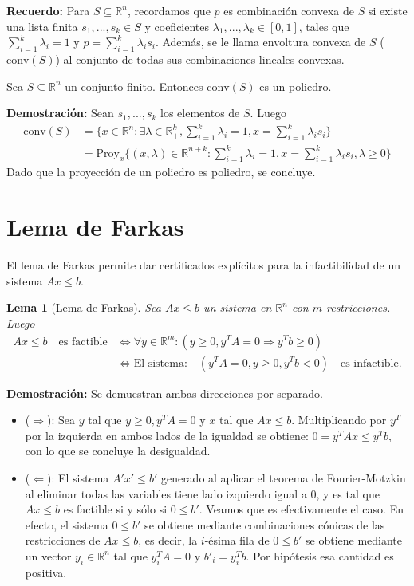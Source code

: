\textbf{Recuerdo: }
Para $S \subseteq \mathbb{R}^{n}$, recordamos que $p$ es combinación convexa de $S$ si existe una lista finita $s_{1},...,s_{k} \in S$ y coeficientes $\lambda_{1},...,\lambda_{k} \in [0,1]$, tales que $\sum_{i=1}^{k}\lambda_{i}=1$ y $p =\sum_{i=1}^{k}\lambda_{i}s_{i}$. Además, se le llama
envoltura convexa de $S$ ($\text{conv}(S)$) al conjunto de todas sus combinaciones lineales convexas.
\begin{teo}
Sea $S \subseteq \mathbb{R}^{n}$ un conjunto finito. Entonces $\text{conv}(S)$ es un poliedro.
\end{teo}
\textbf{Demostración:}
Sean $s_{1},...,s_{k}$ los elementos de $S$. Luego
\begin{align}
    \text{conv}(S)&=\{x \in \mathbb{R}^{n}:\exists \lambda \in \mathbb{R}_{+}^{k},\sum_{i=1}^{k}\lambda_{i}=1,x =\sum_{i=1}^{k}\lambda_{i}s_{i} \}\\
    &=\text{Proy}_{x} \{(x,\lambda) \in \mathbb{R}^{n+k}:\sum_{i=1}^{k}\lambda_{i}=1,x =\sum_{i=1}^{k}\lambda_{i}s_{i}, \lambda \geq 0 \}
\end{align}
Dado que la proyección de un poliedro es poliedro, se concluye. 
\section{Lema de Farkas}
El lema de Farkas permite dar certificados explícitos para la infactibilidad de un sistema $Ax\leq b$.
\newtheorem{lemm}{Lema}
\begin{lemm}[Lema de Farkas]
Sea $Ax\leq b$ un sistema en $\mathbb{R}^n$ con $m$ restricciones. Luego
\begin{align*}
   Ax\leq b \quad \text{es factible} &\Leftrightarrow \forall y \in \mathbb{R}^{m}:\left(y \geq 0, y^{T} A=0 \Longrightarrow y^{T} b \geq 0\right)\\
   &\Leftrightarrow \text{El sistema:} \quad(y^{T} A=0, y \geq 0, y^{T} b<0)\quad \text{es infactible.}
\end{align*}

\end{lemm}
\textbf{Demostración:}
Se demuestran ambas direcciones por separado.\\
\begin{itemize}
    \item ($\Rightarrow$): Sea $y$ tal que $y\geq 0, y^{T} A=0$ y $x$ tal que $Ax \leq b$. Multiplicando por $y^T$ por la izquierda en ambos lados de la igualdad se obtiene: $0=y^{T}Ax\leq y^{T}b$, con lo que se concluye la desigualdad. 
    \item ($\Leftarrow$): El sistema $A'x' \leq b'$ generado al aplicar el teorema de Fourier-Motzkin al eliminar todas las variables tiene lado izquierdo igual a $0$, y es tal que $Ax\leq b$ es factible si y sólo si $0\leq b'$. Veamos que es efectivamente el caso. En efecto, el sistema $0\leq b'$ se obtiene mediante combinaciones cónicas de las restricciones de $Ax\leq b$, es decir, la $i$-ésima fila de $0\leq b'$ se obtiene mediante un vector $y_{i}\in \mathbb{R}^{n}$ tal que $y_{i}^{T}A=0$ y $b'_{i} = y_{i}^{T}b$. Por hipótesis esa cantidad es positiva.
\end{itemize}

